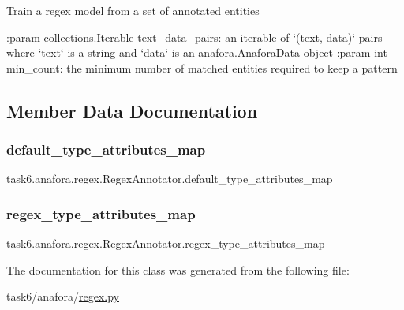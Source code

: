 \begin{DoxyVerb}Train a regex model from a set of annotated entities

:param collections.Iterable text_data_pairs: an iterable of `(text, data)` pairs where `text` is a string and
    `data` is an anafora.AnaforaData object
:param int min_count: the minimum number of matched entities required to keep a pattern
\end{DoxyVerb}
 

\subsection{Member Data Documentation}
\mbox{\label{classtask6_1_1anafora_1_1regex_1_1RegexAnnotator_ae2480f04c3c25ad145dc4738ca7d7df8}} 
\subsubsection{\texorpdfstring{default\+\_\+type\+\_\+attributes\+\_\+map}{default\_type\_attributes\_map}}
{\footnotesize\ttfamily task6.\+anafora.\+regex.\+Regex\+Annotator.\+default\+\_\+type\+\_\+attributes\+\_\+map}

\mbox{\label{classtask6_1_1anafora_1_1regex_1_1RegexAnnotator_a01da64138702436e84e00de752e065e8}} 
\subsubsection{\texorpdfstring{regex\+\_\+type\+\_\+attributes\+\_\+map}{regex\_type\_attributes\_map}}
{\footnotesize\ttfamily task6.\+anafora.\+regex.\+Regex\+Annotator.\+regex\+\_\+type\+\_\+attributes\+\_\+map}



The documentation for this class was generated from the following file\+:\begin{DoxyCompactItemize}
\item 
task6/anafora/\hyperlink{regex_8py}{regex.\+py}\end{DoxyCompactItemize}
